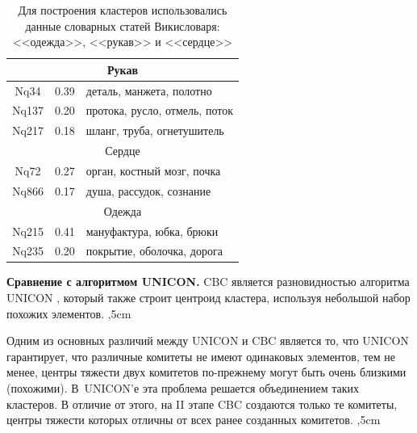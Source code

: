 \documentclass{article}
\begin{document}
\begin{articletext}
\begin{table}[H]
\caption{Для построения кластеров использовались данные словарных статей Викисловаря: <<одежда>>,  <<рукав>> и  <<сердце>>}
\begin{tabular}{|c|c|m{5cm}|}
\hline
\multicolumn{3}{|c|}{Рукав}\\
\hline 
Nq34 & 0.39 & деталь, манжета, полотно\\
Nq137 & 0.20 & протока, русло, отмель, поток\\
Nq217 & 0.18 & шланг, труба, огнетушитель\\
\hline
\multicolumn{3}{|c|}{Сердце}\\
\hline
Nq72 &  0.27 & орган, костный мозг, почка\\
Nq866 & 0.17 & душа, рассудок, сознание\\
\hline
\multicolumn{3}{|c|}{Одежда}\\
\hline
Nq215 & 0.41 & мануфактура, юбка, брюки\\
Nq235 & 0.20 & покрытие, оболочка, дорога\\
\hline
\end{tabular}
\label{yank}
\end{table}

\textbf{Сравнение с алгоритмом UNICON.} CBC является разновидностью алгоритма UNICON \cite{Lin 2001}, который также строит центроид кластера, используя небольшой набор похожих элементов.
,5cm

Одним из основных различий между UNICON и CBC является то, что UNICON гарантирует, что различные комитеты не имеют одинаковых элементов, тем не менее, центры тяжести двух комитетов по-прежнему могут быть очень близкими (похожими). В~UNICON'е эта проблема решается объединением таких кластеров. В отличие от этого, на II этапе CBC создаются только те комитеты, центры тяжести которых отличны от всех ранее созданных комитетов.
,5cm


\end{articletext}
\end{document}
